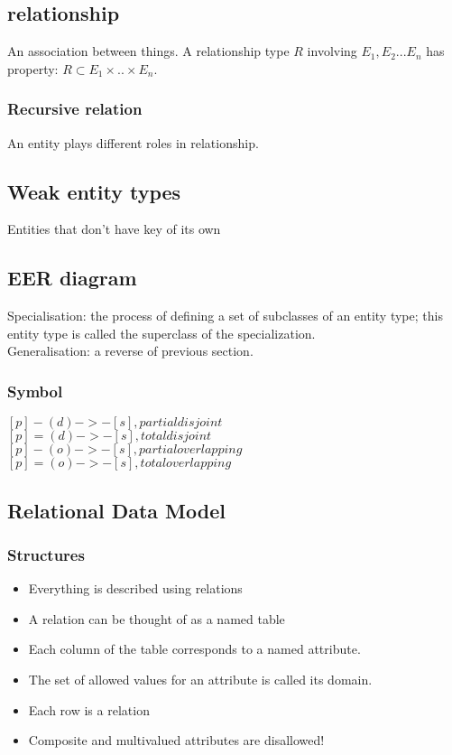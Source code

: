 \documentclass[a4paper]{scrartcl}
\begin{document}
  \subsection{relationship}
    An association between things. A relationship type $R$ involving $E_1,E_2...E_n$ has property: $R \subset E_1 \times .. \times E_n$.
    \subsubsection{Recursive relation}
      An entity plays different roles in relationship.
  \subsection{Weak entity types}
    Entities that don't have key of its own
  \subsection{EER diagram}
    Specialisation: the process of defining a set of subclasses of an entity type; this entity type is called the superclass of the specialization.
    \\
    Generalisation: a reverse of previous section.
    \subsubsection{Symbol}
    $[p] - (d) ->- [s], partial disjoint$\\
    $[p] = (d) ->- [s], total disjoint$\\
    $[p] - (o) ->- [s], partial overlapping$\\
    $[p] = (o) ->- [s], total overlapping$\\
  \subsection{Relational Data Model}
    \subsubsection{Structures}
      \begin{itemize}
        \item Everything is described using relations
        \item A relation can be thought of as a named table
        \item Each column of the table corresponds to a named attribute.
        \item The set of allowed values for an attribute is called its domain.
        \item Each row is a relation
        \item Composite and multivalued attributes are disallowed!
      \end{itemize}
\end{document}
